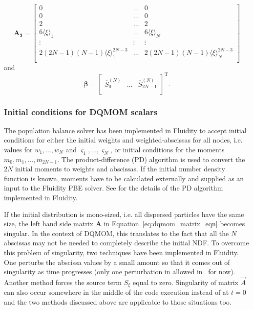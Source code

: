 \begin{equation} \label{eq:A_3}
\mathbf{A_3} = 	\begin{bmatrix}
		0 & \dots & 0 \\
		0 & \dots & 0 \\
		2 & \dots & 2 \\
		6 \langle \xi \rangle_1 & \dots & 6 \langle \xi \rangle_N \\
		\vdots & \vdots & \vdots \\
		2(2N-1)(N-1) \langle \xi \rangle_1^{2N-3} & \dots & 2(2N-1)(N-1) \langle \xi \rangle_N^{2N-3} \\		
		\end{bmatrix}
\end{equation}
and 
\begin{equation} \label{eq:beta_vector}
\pmb{\beta} = 	\begin{bmatrix}
		\overline{S}_0^{(N)} & \dots & \overline{S}_{2N-1}^{(N)} \\	
		\end{bmatrix}^\mathrm{T}.
\end{equation}

\subsubsection{Initial conditions for DQMOM scalars} \label{sec:pbe_initial_conditions}
The population balance solver has been implemented in Fluidity to accept initial conditions for either the initial weights and weighted-abscissas for all nodes, i.e. values for $w_1, \dots, w_N$ and $\varsigma_1, \dots, \varsigma_N$, or initial conditions for the moments $m_0, m_1, \dots, m_{2N-1}$. The product-difference (PD) algorithm \citep{gordon1968error} is used to convert the $2N$ initial moments to weights and abscissas. If the initial number density function is known, moments have to be calculated externally and supplied as an input to the Fluidity PBE solver. See \cite{bhutani2016} for the details of the PD algorithm implemented in Fluidity. 

If the initial distribution is mono-sized, i.e. all dispersed particles have the same size, the left hand side matrix $\mathbf{A}$ in Equation~\eqref{eq:dqmom_matrix_eqn} becomes singular. In the context of DQMOM, this translates to the fact that all the $N$ abscissas may not be needed to completely describe the initial NDF. To overcome this problem of singularity, two techniques have been implemented in Fluidity. One perturbs the abscissa values by a small amount so that it comes out of singularity as time progresses \citep{marchisio2005solution} (only one perturbation in allowed in \fluidity\ for now). Another method forces the source term $S_{\xi}$ equal to zero. Singularity of matrix $\vec{A}$ can also occur somewhere in the middle of the code execution instead of at $t=0$ and the two methods discussed above are applicable to those situations too. 

